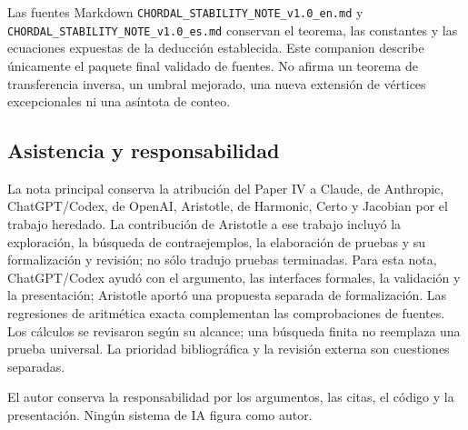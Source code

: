 \documentclass[spanish,11pt,a4paper]{article}
\begin{document}
Las fuentes Markdown \nolinkurl{CHORDAL_STABILITY_NOTE_v1.0_en.md} y
\nolinkurl{CHORDAL_STABILITY_NOTE_v1.0_es.md} conservan el teorema, las
constantes y las ecuaciones expuestas de la deducción establecida. Este
companion describe únicamente el paquete final validado de fuentes. No
afirma un teorema de transferencia inversa, un umbral mejorado, una
nueva extensión de vértices excepcionales ni una asíntota de conteo.

\subsection{Asistencia y
responsabilidad}\label{asistencia-y-responsabilidad}

La nota principal conserva la atribución del Paper IV a Claude, de
Anthropic, ChatGPT/Codex, de OpenAI, Aristotle, de Harmonic, Certo y
Jacobian por el trabajo heredado. La contribución de Aristotle a ese
trabajo incluyó la exploración, la búsqueda de contraejemplos, la
elaboración de pruebas y su formalización y revisión; no sólo tradujo
pruebas terminadas. Para esta nota, ChatGPT/Codex ayudó con el
argumento, las interfaces formales, la validación y la presentación;
Aristotle aportó una propuesta separada de formalización. Las
regresiones de aritmética exacta complementan las comprobaciones de
fuentes. Los cálculos se revisaron según su alcance; una búsqueda finita
no reemplaza una prueba universal. La prioridad bibliográfica y la
revisión externa son cuestiones separadas.

El autor conserva la responsabilidad por los argumentos, las citas, el
código y la presentación. Ningún sistema de IA figura como autor.
\end{document}

